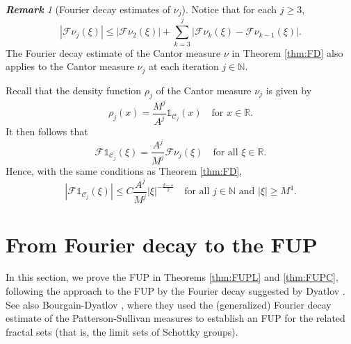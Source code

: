 \documentclass[12pt,reqno]{amsart}
\newcommand\Cc{\mathcal{C}}
\newcommand\Char{\mathds{1}}
\newcommand\Fc{\mathcal{F}}
\newcommand\N{\mathbb{N}}
\newcommand\R{\mathbb{R}}
\newcommand\ve{\varepsilon}
\theoremstyle{plain}
\theoremstyle{remark}
\newtheorem*{rmk}{\textbf{Remark}}
\numberwithin{equation}{section}
\begin{document}
\begin{rmk}[Fourier decay estimates of $\nu_j$]
Notice that for each $j\ge3$,
$$\left|\Fc\nu_j(\xi)\right|\le\left|\Fc\nu_2(\xi)\right|+\sum_{k=3}^j\left|\Fc\nu_k(\xi)-\Fc\nu_{k-1}(\xi)\right|.$$
The Fourier decay estimate of the Cantor measure $\nu$ in Theorem \ref{thm:FD} also applies to the Cantor measure $\nu_j$ at each iteration $j\in\N$. 

Recall that the density function $\rho_j$ of the Cantor measure $\nu_j$ is given by 
$$\rho_j(x)=\frac{M^j}{A^j}\Char_{\Cc_j}(x)\quad\text{for }x\in\R.$$
It then follows that
$$\Fc\Char_{\Cc_j}(\xi)=\frac{A^j}{M^j}\Fc\nu_j(\xi)\quad\text{for all }\xi\in\R.$$
Hence, with the same conditions as Theorem \ref{thm:FD},
\begin{equation}\label{eq:FDj}
\left|\Fc\Char_{\Cc_j}(\xi)\right|\le C\frac{A^j}{M^j}|\xi|^{-\frac{\delta-\ve}{2}}\quad\text{for all }j\in\N\text{ and }|\xi|\ge M^4.
\end{equation}
\end{rmk}


\section{From Fourier decay to the FUP}\label{sec:FUP}
In this section, we prove the FUP in Theorems \ref{thm:FUPL} and \ref{thm:FUPC}, following the approach to the FUP by the Fourier decay suggested by Dyatlov \cite[Section V]{Dy}. See also Bourgain-Dyatlov \cite[Section 4]{BD1}, where they used the (generalized) Fourier decay estimate of the Patterson-Sullivan measures to establish an FUP for the related fractal sets (that is, the limit sets of Schottky groups). 
\end{document}
